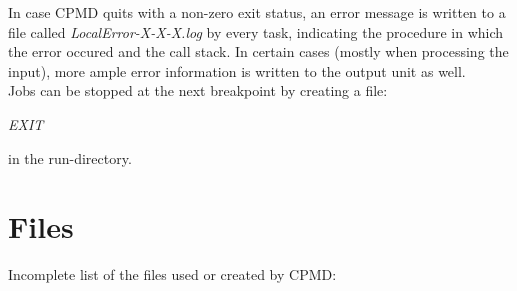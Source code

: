\documentclass[twoside,10pt,titlepage,a4paper]{article}
\begin{document}
In case CPMD quits with a non-zero exit status, an error message is written to a file called
\emph{LocalError-X-X-X.log} by every task, indicating the procedure in which the error occured
and the call stack. In certain cases (mostly when processing the input), more ample error information
is written to the output unit as well.
\\

  Jobs can be stopped at the next breakpoint by creating a file:

\medskip

\begin{center}
{\em EXIT}
\end{center}
                
\noindent
in the run-directory.
%
%
%
\clearpage
\section{Files}\label{FILES}
%

Incomplete list of the files used or created by CPMD:\par
\end{document}
